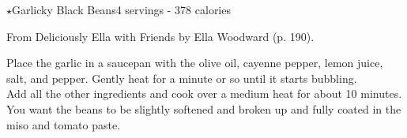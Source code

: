 \begin{recipe}{\texorpdfstring{$\star$}{str}Garlicky Black Beans}{4 servings - 378 calories}{}

\freeform From {\normalfont Deliciously Ella with Friends} by Ella Woodward (p. 190).


Place the garlic in a saucepan with the olive oil, cayenne pepper, lemon juice, salt, and pepper. Gently heat for a minute or so until it starts bubbling.\\

Add all the other ingredients and cook over a medium heat for about 10 minutes. You want the beans to be slightly softened and broken up and fully coated in the miso and tomato paste.

\end{recipe}